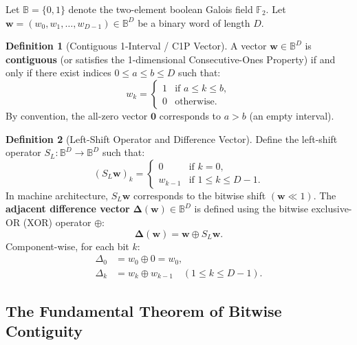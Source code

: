 \documentclass[11pt,a4paper]{article}
\theoremstyle{definition}
\newtheorem{definition}{Definition}
\begin{document}
Let $\mathbb{B} = \{0, 1\}$ denote the two-element boolean Galois field $\mathbb{F}_2$. Let $\mathbf{w} = (w_0, w_1, \dots, w_{D-1}) \in \mathbb{B}^D$ be a binary word of length $D$.

\begin{definition}[Contiguous 1-Interval / C1P Vector]
A vector $\mathbf{w} \in \mathbb{B}^D$ is \textbf{contiguous} (or satisfies the 1-dimensional Consecutive-Ones Property) if and only if there exist indices $0 \le a \le b \le D$ such that:
\begin{equation}
    w_k = \begin{cases}
        1 & \text{if } a \le k \le b, \\
        0 & \text{otherwise}.
    \end{cases}
\end{equation}
By convention, the all-zero vector $\mathbf{0}$ corresponds to $a > b$ (an empty interval).
\end{definition}

\begin{definition}[Left-Shift Operator and Difference Vector]
Define the left-shift operator $S_L: \mathbb{B}^D \to \mathbb{B}^D$ such that:
\begin{equation}
    (S_L \mathbf{w})_k = \begin{cases}
        0 & \text{if } k = 0, \\
        w_{k-1} & \text{if } 1 \le k \le D-1.
    \end{cases}
\end{equation}
In machine architecture, $S_L \mathbf{w}$ corresponds to the bitwise shift $(\mathbf{w} \ll 1)$. The \textbf{adjacent difference vector} $\bm{\Delta}(\mathbf{w}) \in \mathbb{B}^D$ is defined using the bitwise exclusive-OR (XOR) operator $\oplus$:
\begin{equation}
    \bm{\Delta}(\mathbf{w}) = \mathbf{w} \oplus S_L \mathbf{w}.
\end{equation}
Component-wise, for each bit $k$:
\begin{align}
    \Delta_0 &= w_0 \oplus 0 = w_0, \\
    \Delta_k &= w_k \oplus w_{k-1} \quad (1 \le k \le D-1).
\end{align}
\end{definition}

\subsection{The Fundamental Theorem of Bitwise Contiguity}
\end{document}
